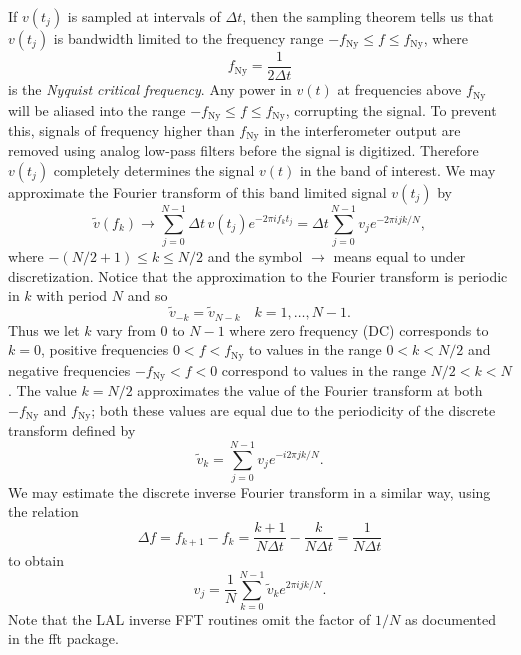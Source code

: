 If $v(t_j)$ is sampled at intervals of $\Delta t$, then the sampling theorem
tells us that $v(t_j)$ is bandwidth limited to the frequency range
$-f_\mathrm{Ny} \le f \le f_\mathrm{Ny}$, where
\begin{equation}
f_\mathrm{Ny} = \frac{1}{2\Delta t}
\end{equation}
is the \emph{Nyquist critical frequency}. Any power in $v(t)$ at frequencies
above $f_\mathrm{Ny}$ will be aliased into the range $-f_\mathrm{Ny} \le f
\le f_\mathrm{Ny}$, corrupting the signal. To prevent this, signals of
frequency higher than $f_\mathrm{Ny}$ in the interferometer output are removed
using analog low-pass filters before the signal is digitized. Therefore
$v(t_j)$ completely determines the signal $v(t)$ in the band of interest. We
may approximate the Fourier transform of this band limited signal $v(t_j)$ by
\begin{equation}
\tilde{v}(f_k) \rightarrow \sum_{j=0}^{N-1} \Delta t\, v(t_j) e^{-2 \pi i f_k t_j}
= \Delta t \sum_{j=0}^{N-1} v_j e^{-2 \pi i j k / N},
\label{eq:fftapprox}
\end{equation}
where $-(N/2 + 1) \le k \le N/2$ and the symbol $\rightarrow$ means
equal to under discretization.  Notice that the approximation to the
Fourier transform is periodic in $k$ with period $N$ and so
\begin{equation}
\tilde{v}_{-k} = \tilde{v}_{N-k}\quad k = 1, \ldots, N - 1.
\end{equation}
Thus we let $k$ vary from $0$ to $N-1$ where zero frequency (DC) corresponds
to $k=0$, positive frequencies $0 < f < f_\mathrm{Ny}$ to values in the range
$0 < k < N/2$ and negative frequencies $-f_\mathrm{Ny} < f < 0$ correspond
to values in the range $N/2 < k < N$. The value $k = N/2$ approximates the
value of the Fourier transform at both $-f_\mathrm{Ny}$ and $f_\mathrm{Ny}$;
both these values are equal due to the periodicity of the discrete transform
defined by
\begin{equation}
\tilde{v}_k = \sum_{j=0}^{N-1} v_j e^{-i 2 \pi j k / N}.
\label{eq:dftdef}
\end{equation}
We may estimate the discrete inverse Fourier transform
in a similar way, using the relation
\begin{equation}
\Delta f = f_{k+1} - f_k = \frac{k+1}{N\Delta t} - \frac{k}{N\Delta t} =
\frac{1}{N\Delta t}
\end{equation}
to obtain
\begin{equation}
v_j = \frac{1}{N} \sum_{k=0}^{N-1} \tilde{v}_k e^{2 \pi i j k / N}.
\end{equation}
Note that the LAL inverse FFT routines omit the factor of $1/N$ as documented
in the fft package.


